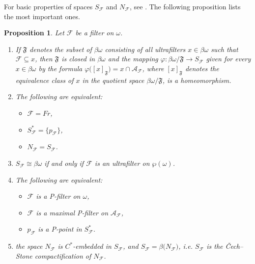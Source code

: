\documentclass[a4paper,11pt,fleqn]{amsart}
\newtheorem{proposition}[theorem]{Proposition}
\theoremstyle{definition}
\theoremstyle{remark}
\numberwithin{equation}{section}
\newcommand{\N}{\mathbb{N}}
\newcommand{\aA}{\mathcal{A}}
\newcommand{\fF}{\mathcal{F}}
\newcommand{\sub}{\subseteq}
\newcommand{\wo}{{\wp(\omega)}}%
\newcommand{\bo}{{\beta\omega}}%
\begin{document}
For basic properties of spaces $S_{\fF}$ and $N_{\fF}$, see \cite[Section 3]{MS24}. The following proposition lists the most important ones.

\begin{proposition}\label{prop:sf_properties}
    Let $\fF$ be a filter on $\omega$.
    \begin{enumerate}
        \item If $\mathfrak{F}$ denotes the subset of $\bo$ consisting of all ultrafilters $x\in\bo$ such that $\fF\sub x$, then $\mathfrak{F}$ is closed in $\bo$ and the mapping $\varphi\colon\bo/\mathfrak{F}\to S_{\fF}$ given for every $x\in\bo$ by the formula $\varphi\big([x]_{\mathfrak{F}}\big)=x\cap\aA_\fF$, where $[x]_{\mathfrak{F}}$ denotes the equivalence class of $x$ in the quotient space $\bo/\mathfrak{F}$, is a homeomorphism.
        \item The following are equivalent:
        \begin{itemize}
            \item $\fF=Fr$,
            \item $S_{\fF}^*=\big\{p_{\fF}\big\}$,
            \item $N_{\fF}=S_{\fF}$.
        \end{itemize}
        \item $S_{\fF}\cong\bo$ if and only if $\fF$ is an ultrafilter on $\wo$.
        \item The following are equivalent:
        \begin{itemize}
            \item $\fF$ is a P-filter on $\omega$,
	    \item $\fF$ is a maximal P-filter on $\aA_{\fF}$,
	    \item $p_\fF$ is a P-point in $S_{\fF}^*$.
        \end{itemize}
        \item the space $N_{\fF}$ is $C^*$-embedded in $S_{\fF}$, and $S_{\fF}=\beta\big(N_{\fF}\big)$, i.e. $S_{\fF}$ is the \v{C}ech--Stone compactification of $N_{\fF}$.%
    \end{enumerate}
\end{proposition}
\end{document}
